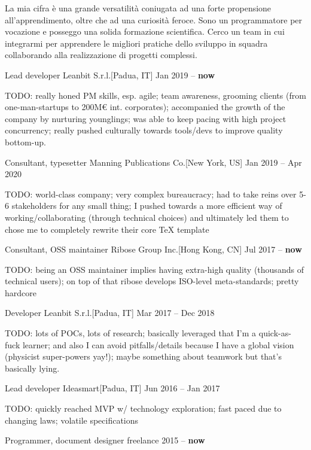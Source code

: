 \documentclass[9pt]{scrartcl}
\newlength{\Pad}\setlength{\Pad}{0.2in}
\begin{document}

La mia cifra è una grande versatilità coniugata ad una forte propensione
all'apprendimento, oltre che ad una curiosità feroce.
Sono un programmatore per vocazione e posseggo una solida formazione scientifica.
Cerco un team in cui integrarmi per apprendere le migliori pratiche dello sviluppo
in squadra collaborando alla realizzazione di progetti complessi.


\Event
  {Lead developer}
  {Leanbit S.r.l.}[Padua, IT]
  {Jan 2019 -- \textbf{now}}

TODO: really honed PM skills, esp. agile; team awareness, grooming clients (from one-man-startups to 200M€ int. corporates); accompanied the growth of the company by nurturing younglings; was able to keep pacing with high project concurrency; really pushed culturally towards tools/devs to improve quality bottom-up.

\Event
  {Consultant, typesetter}
  {Manning Publications Co.}[New York, US]
  {Jan 2019 -- Apr 2020}

TODO: world-class company; very complex bureaucracy; had to take reins over 5-6 stakeholders for any small thing; I pushed towards a more efficient way of working/collaborating (through technical choices) and ultimately led them to chose me to completely rewrite their core TeX template

\Event
  {Consultant, OSS maintainer}
  {Ribose Group Inc.}[Hong Kong, CN]
  {Jul 2017 -- \textbf{now}}

TODO: being an OSS maintainer implies having extra-high quality (thousands of technical users); on top of that ribose develops ISO-level meta-standards; pretty hardcore

\Event
  {Developer}
  {Leanbit S.r.l.}[Padua, IT]
  {Mar 2017 -- Dec 2018}

TODO: lots of POCs, lots of research; basically leveraged that I'm a quick-as-fuck learner; and also I can avoid pitfalls/details because I have a global vision (physicist super-powers yay!); maybe something about teamwork but that's basically lying.

\Event
  {Lead developer}
  {Ideasmart}[Padua, IT]
  {Jun 2016 -- Jan 2017}

TODO: quickly reached MVP w/ technology exploration; fast paced due to changing laws; volatile specifications

\Event
  {Programmer, document designer}
  {freelance}
  {2015 -- \textbf{now}}
\end{document}

